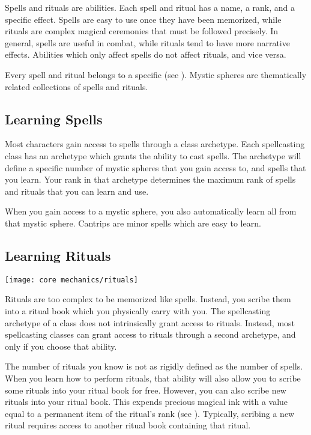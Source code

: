   Spells and rituals are \magical abilities.
  Each spell and ritual has a name, a rank, and a specific effect.
  Spells are easy to use once they have been memorized, while rituals are complex magical ceremonies that must be followed precisely.
  In general, spells are useful in combat, while rituals tend to have more narrative effects.
  Abilities which only affect spells do not affect rituals, and vice versa.

  Every spell and ritual belongs to a specific  (see ).
  Mystic spheres are thematically related collections of spells and rituals.

  \subsection{Learning Spells}\label{Learning Spells}
    Most characters gain access to spells through a class archetype.
    Each spellcasting class has an archetype which grants the ability to cast spells.
    The archetype will define a specific number of mystic spheres that you gain access to, and spells that you learn.
    Your rank in that archetype determines the maximum rank of spells and rituals that you can learn and use.

    When you gain access to a mystic sphere, you also automatically learn all  from that mystic sphere.
    Cantrips are minor spells which are easy to learn.

  \subsection{Learning Rituals}
    \texttt{[image: core mechanics/rituals]}

    Rituals are too complex to be memorized like spells.
    Instead, you scribe them into a ritual book which you physically carry with you.
    The spellcasting archetype of a class does not intrinsically grant access to rituals.
    Instead, most spellcasting classes can grant access to rituals through a second archetype, and only if you choose that ability.

    The number of rituals you know is not as rigidly defined as the number of spells.
    When you learn how to perform rituals, that ability will also allow you to scribe some rituals into your ritual book for free.
    However, you can also scribe new rituals into your ritual book.
    This expends precious magical ink with a value equal to a permanent item of the ritual's rank (see ).
    Typically, scribing a new ritual requires access to another ritual book containing that ritual.


